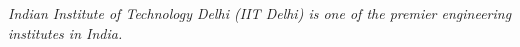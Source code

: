 
\textit{Indian Institute of Technology Delhi (IIT Delhi) is one of the premier engineering institutes in India.}
